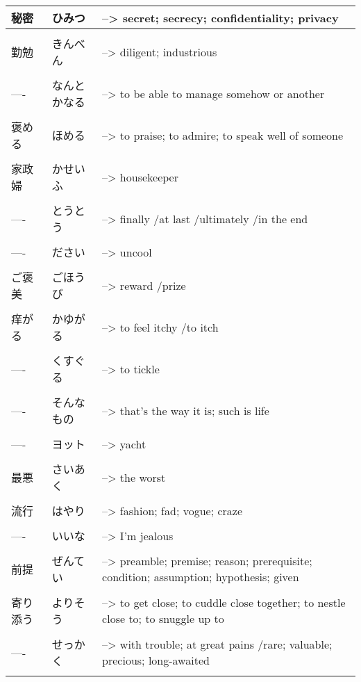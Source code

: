 \documentclass{article}
\begin{document}
\begin{tabular}{ l | l p{14cm}  }
秘密 & ひみつ &--> secret; secrecy; confidentiality; privacy \\ \hline\\[-1em]
勤勉 & きんべん &--> diligent; industrious \\ \hline\\[-1em]
---- & なんとかなる &--> to be able to manage somehow or another \\ \hline\\[-1em]
褒める & ほめる &--> to praise; to admire; to speak well of someone \\ \hline\\[-1em]
家政婦 & かせいふ &--> housekeeper \\ \hline\\[-1em]
---- & とうとう &--> finally /at last /ultimately /in the end \\ \hline\\[-1em]
---- & ださい &--> uncool \\ \hline\\[-1em]
ご褒美 & ごほうび &--> reward /prize \\ \hline\\[-1em]
痒がる & かゆがる &--> to feel itchy /to itch \\ \hline\\[-1em]
---- & くすぐる &--> to tickle \\ \hline\\[-1em]
---- & そんなもの &--> that's the way it is; such is life \\ \hline\\[-1em]
---- & ヨット &--> yacht \\ \hline\\[-1em]
最悪 & さいあく &--> the worst \\ \hline\\[-1em]
流行 & はやり &--> fashion; fad; vogue; craze \\ \hline\\[-1em]
---- & いいな &--> I'm jealous \\ \hline\\[-1em]
前提 & ぜんてい &--> preamble; premise; reason; prerequisite; condition; assumption; hypothesis; given \\ \hline\\[-1em]
寄り添う & よりそう &--> to get close; to cuddle close together; to nestle close to; to snuggle up to \\ \hline\\[-1em]
---- & せっかく &--> with trouble; at great pains /rare; valuable; precious; long-awaited \\ \hline\\[-1em]

\end{tabular}
\end{document}
